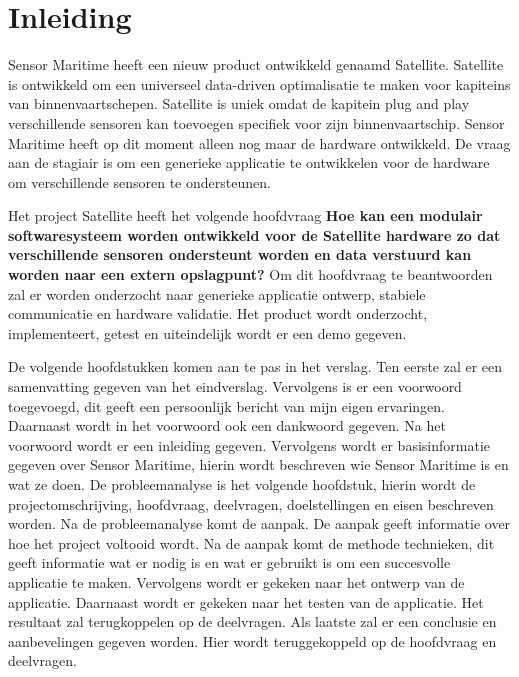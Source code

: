 \chapter{Inleiding}
Sensor Maritime heeft een nieuw product ontwikkeld genaamd Satellite. Satellite is ontwikkeld om een universeel data-driven optimalisatie te maken voor kapiteins van binnenvaartschepen. Satellite is uniek omdat de kapitein plug and play verschillende sensoren kan toevoegen specifiek voor zijn binnenvaartschip. Sensor Maritime heeft op dit moment alleen nog maar de hardware ontwikkeld. De vraag aan de stagiair is om een generieke applicatie te ontwikkelen voor de hardware om verschillende sensoren te ondersteunen.\newline

\noindent Het project Satellite heeft het volgende hoofdvraag \textbf{Hoe kan een modulair softwaresysteem worden ontwikkeld voor de Satellite hardware zo dat verschillende sensoren ondersteunt worden en data verstuurd kan worden naar een extern opslagpunt?} Om dit hoofdvraag te beantwoorden zal er worden onderzocht naar generieke applicatie ontwerp, stabiele communicatie en hardware validatie. Het product wordt onderzocht, implementeert, getest en uiteindelijk wordt er een demo gegeven. \newline


\noindent De volgende hoofdstukken komen aan te pas in het verslag. Ten eerste zal er een samenvatting gegeven van het eindverslag. Vervolgens is er een voorwoord toegevoegd, dit geeft een persoonlijk bericht van mijn eigen ervaringen. Daarnaast wordt in het voorwoord ook een dankwoord gegeven. Na het voorwoord wordt er een inleiding gegeven. Vervolgens wordt er basisinformatie gegeven over Sensor Maritime, hierin wordt beschreven wie Sensor Maritime is en wat ze doen. De probleemanalyse is het volgende hoofdstuk, hierin wordt de projectomschrijving, hoofdvraag, deelvragen, doelstellingen en eisen beschreven worden. Na de probleemanalyse komt de aanpak. De aanpak geeft informatie over hoe het project voltooid wordt. Na de aanpak komt de methode technieken, dit geeft informatie wat er nodig is en wat er gebruikt is om een succesvolle applicatie te maken. Vervolgens wordt er gekeken naar het ontwerp van de applicatie. Daarnaast wordt er gekeken naar het testen van de applicatie. Het resultaat zal terugkoppelen op de deelvragen. Als laatste zal er een conclusie en aanbevelingen gegeven worden. Hier wordt teruggekoppeld op de hoofdvraag en deelvragen.